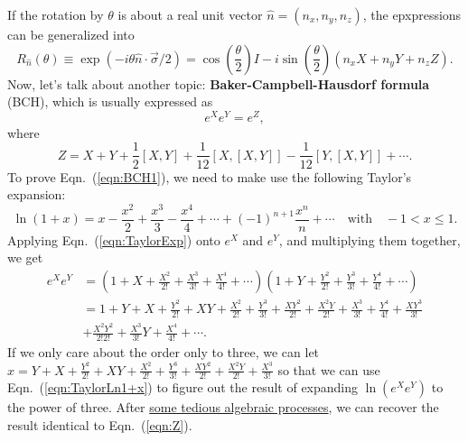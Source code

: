 If the rotation by $\theta$ is about a real unit vector $\hat{n}=(n_x, n_y, n_z)$, the epxpressions can be generalized into 
\begin{equation}
    R_{\hat{n}}(\theta)\equiv\exp(-i\theta\hat{n}\cdot\vec{\sigma}/2)=\cos\left(\frac{\theta}{2}\right)I-i\sin\left(\frac{\theta}{2}\right)(n_xX+n_yY+n_zZ).
\end{equation}
Now, let's talk about another topic: \textbf{Baker-Campbell-Hausdorf formula} (BCH), which is usually expressed as
\begin{equation}
    e^Xe^Y=e^Z,
    \label{eqn:BCH1}
\end{equation}
where 
\begin{equation}
    Z=X+Y+\frac{1}{2}[X,Y]+\frac{1}{12}\left[X,[X,Y]\right]-\frac{1}{12}\left[Y,[X,Y]\right]+\cdots.
    \label{eqn:Z}
\end{equation}
To prove Eqn.~(\ref{eqn:BCH1}), we need to make use the following Taylor's expansion:
\begin{equation}
    \ln(1+x)=x-\frac{x^2}{2}+\frac{x^3}{3}-\frac{x^4}{4}+\cdots+(-1)^{n+1}\frac{x^n}{n}+\cdots\quad\text{with}\quad-1<x\le 1.
    \label{eqn:TaylorLn1+x}
\end{equation}
Applying Eqn.~(\ref{eqn:TaylorExp}) onto $e^X$ and $e^Y$, and multiplying them together, we get
\begin{equation}
    \begin{split}
        e^Xe^Y&=\left(1+X+\frac{X^2}{2!}+\frac{X^3}{3!}+\frac{X^4}{4!}+\cdots\right)\left(1+Y+\frac{Y^2}{2!}+\frac{Y^3}{3!}+\frac{Y^4}{4!}+\cdots\right)\\
        &=1+Y+X+\frac{Y^2}{2!}+XY+\frac{X^2}{2!}+\frac{Y^3}{3!}+\frac{XY^2}{2!}+\frac{X^2Y}{2!}+\frac{X^3}{3!}+\frac{Y^4}{4!}+\frac{XY^3}{3!}\\
        &+\frac{X^2Y^2}{2!2!}+\frac{X^3}{3!}Y+\frac{X^4}{4!}+\cdots.
    \end{split}
\end{equation}
If we only care about the order only to three, we can let $x=Y+X+\frac{Y^2}{2!}+XY+\frac{X^2}{2!}+\frac{Y^3}{3!}+\frac{XY^2}{2!}+\frac{X^2Y}{2!}+\frac{X^3}{3!}$ so that we can use Eqn.~(\ref{eqn:TaylorLn1+x}) to figure out the result of expanding $\ln(e^Xe^Y)$ to the power of three. After \href{https://www.youtube.com/watch?v=vt3_uYU98RI}{some tedious algebraic processes}, we can recover the result identical to Eqn.~(\ref{eqn:Z}).


